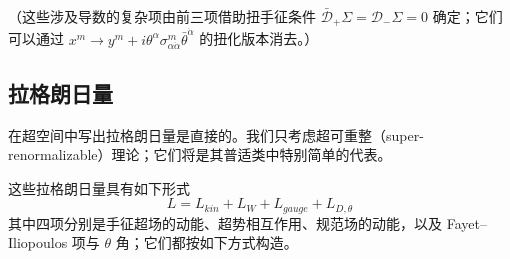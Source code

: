 \label{op:10}
（这些涉及导数的复杂项由前三项借助扭手征条件 $\bar{\mathcal D}_+\Sigma=\mathcal D_-\Sigma=0$ 确定；它们可以通过 $x^m\to y^m+i\theta^\alpha\sigma^m_{\alpha\dot\alpha}\bar\theta^{\dot\alpha}$ 的扭化版本消去。）


\subsection*{拉格朗日量}

在超空间中写出拉格朗日量是直接的。我们只考虑超可重整（super-renormalizable）理论；它们将是其普适类中特别简单的代表。

这些拉格朗日量具有如下形式
\begin{equation}\tag{2.17}
L=L_{kin}+L_W+L_{gauge}+L_{D,\theta}
\end{equation}
其中四项分别是手征超场的动能、超势相互作用、规范场的动能，以及 Fayet--Iliopoulos 项与 $\theta$ 角；它们都按如下方式构造。

